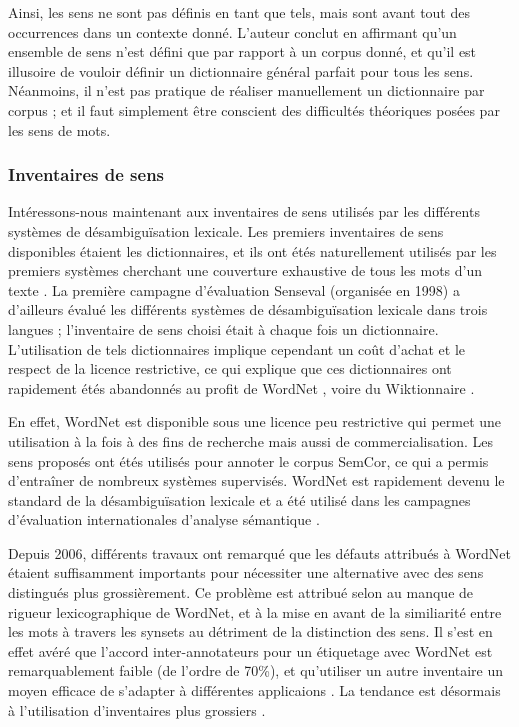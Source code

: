 
Ainsi, les sens ne sont pas définis en tant que tels, mais sont avant tout des
occurrences dans un contexte donné. L'auteur conclut en affirmant qu'un
ensemble de sens n'est défini que par rapport à un corpus donné, et qu'il est
illusoire de vouloir définir un dictionnaire général parfait pour tous les
sens. Néanmoins, il n'est pas pratique de réaliser manuellement un dictionnaire
par corpus ; et il faut simplement être conscient des difficultés théoriques
posées par les sens de mots. 

\subsubsection{Inventaires de sens}

Intéressons-nous maintenant aux inventaires de sens utilisés par les différents
systèmes de désambiguïsation lexicale. Les premiers inventaires de sens
disponibles étaient les dictionnaires, et ils ont étés naturellement utilisés
par les premiers systèmes cherchant une couverture exhaustive de tous les mots
d'un texte \citep{lesk1986automatic}. La première campagne d'évaluation
Senseval (organisée en 1998) \citep{kilgarriff2000introduction} a d'ailleurs
évalué les différents systèmes de désambiguïsation lexicale dans trois langues
; l'inventaire de sens choisi était à chaque fois un dictionnaire.
L'utilisation de tels dictionnaires implique cependant un coût d'achat et le
respect de la licence restrictive, ce qui explique que ces dictionnaires ont
rapidement étés abandonnés au profit de WordNet
\citep{edmonds2002introduction}, voire du Wiktionnaire
\citep{mouton2010jaws}.%

En effet, WordNet est disponible sous une licence peu restrictive qui permet
une utilisation à la fois à des fins de recherche mais aussi de
commercialisation. Les sens proposés ont étés utilisés pour annoter le corpus
SemCor, ce qui a permis d'entraîner de nombreux systèmes supervisés. WordNet est
rapidement devenu le standard de la désambiguïsation lexicale et a été utilisé
dans les campagnes d'évaluation internationales d'analyse sémantique
\citep{navigli2009word}.

Depuis 2006, différents travaux \citep{navigli2007semeval,hovy2006ontonotes}
ont remarqué que les défauts attribués à WordNet
\citep{snow2007learning,ide2007making} étaient suffisamment importants pour
nécessiter une alternative avec des sens distingués plus grossièrement. Ce
problème est attribué selon \cite{edmonds2002introduction} au manque de rigueur
lexicographique de WordNet, et à la mise en avant de la similiarité entre les
mots à travers les synsets au détriment de la distinction des sens. Il s'est en
effet avéré que l'accord inter-annotateurs pour un étiquetage avec WordNet est
remarquablement faible (de l'ordre de 70\%), et qu'utiliser un autre inventaire
un moyen efficace de s'adapter à différentes applicaions
\citep{palmer2004different}. La tendance est désormais à l'utilisation
d'inventaires plus grossiers \citep{navigli2007semeval,navigli2012quick}.

